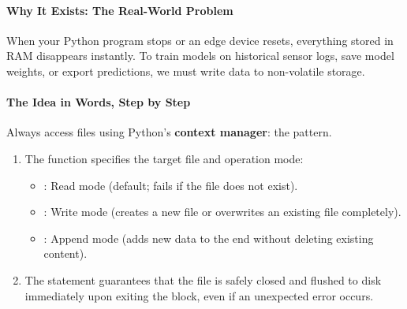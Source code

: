 \paragraph{Why It Exists: The Real-World Problem}
When your Python program stops or an edge device resets, everything stored in RAM disappears instantly. To train models on historical sensor logs, save model weights, or export predictions, we must write data to non-volatile storage.

\paragraph{The Idea in Words, Step by Step}
Always access files using Python's \textbf{context manager}: the  pattern.
\begin{enumerate}
    \item The  function specifies the target file and operation mode:
    \begin{itemize}
        \item {}: Read mode (default; fails if the file does not exist).
        \item {}: Write mode (creates a new file or overwrites an existing file completely).
        \item {}: Append mode (adds new data to the end without deleting existing content).
    \end{itemize}
    \item The  statement guarantees that the file is safely closed and flushed to disk immediately upon exiting the block, even if an unexpected error occurs.
\end{enumerate}

